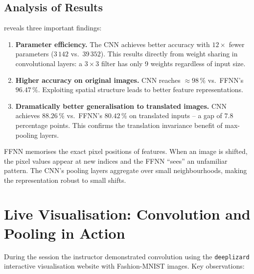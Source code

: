 \documentclass[12pt,a4paper]{article}
\begin{document}
\subsection{Analysis of Results}
\label{subsec:analysis}

 reveals three important findings:

\begin{enumerate}[label=\arabic*.]
  \item \textbf{Parameter efficiency.}  The CNN achieves better accuracy
        with $12\times$ fewer parameters ($3\,142$ vs.\ $39\,352$).  This
        results directly from weight sharing in convolutional layers: a
        $3\times3$ filter has only 9 weights regardless of input size.
  \item \textbf{Higher accuracy on original images.}  CNN reaches
        $\approx 98\,\%$ vs.\ FFNN's $96.47\,\%$.  Exploiting spatial
        structure leads to better feature representations.
  \item \textbf{Dramatically better generalisation to translated images.}
        CNN achieves $88.26\,\%$ vs.\ FFNN's $80.42\,\%$ on translated
        inputs -- a gap of $7.8$ percentage points.  This confirms the
        translation invariance benefit of max-pooling layers.
\end{enumerate}

\begin{keyinsight}[title=Key Insight: Why CNN Handles Translation]
FFNN memorises the exact pixel positions of features.  When an image is
shifted, the pixel values appear at new indices and the FFNN ``sees'' an
unfamiliar pattern.  The CNN's pooling layers aggregate over small
neighbourhoods, making the representation robust to small shifts.
\end{keyinsight}

\section{Live Visualisation: Convolution and Pooling in Action}
\label{sec:visualisation}

During the session the instructor demonstrated convolution using the
\texttt{deeplizard} interactive visualisation website with Fashion-MNIST
images.  Key observations:
\end{document}

